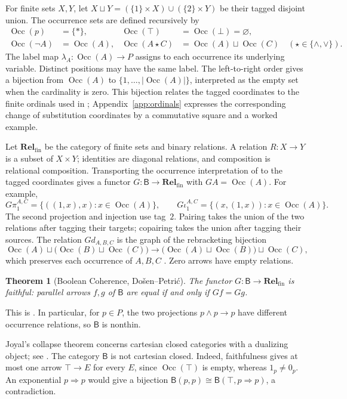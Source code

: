 \documentclass[11pt]{article}
\newtheorem{theorem}{Theorem}[section]
\newcommand{\B}{\mathsf B}
\newcommand{\Occ}{\operatorname{Occ}}
\newcommand{\Rel}{\mathbf{Rel}_{\mathrm{fin}}}
\begin{document}
For finite sets $X,Y$, let
$X\sqcup Y=(\{1\}\times X)\cup(\{2\}\times Y)$ be their tagged
disjoint union. The occurrence sets are defined recursively by
\[
 \begin{aligned}
 \Occ(p)&=\{*\},&
 \Occ(\top)&=\Occ(\bot)=\varnothing,\\
 \Occ(\neg A)&=\Occ(A),&
 \Occ(A\mathbin\star C)&=\Occ(A)\sqcup\Occ(C)
       \quad(\star\in\{\wedge,\vee\}).
 \end{aligned}
\]
The label map $\lambda_A:\Occ(A)\to P$ assigns to each occurrence
its underlying variable. Distinct positions may have the same label.
The left-to-right
order gives a bijection from $\Occ(A)$ to
$\{1,\ldots,|\Occ(A)|\}$, interpreted as the empty set when the
cardinality is zero. This bijection relates the tagged coordinates to
the finite ordinals used in \cite{DP}; Appendix~\ref{app:ordinals}
expresses the corresponding change of substitution coordinates by a
commutative square and a worked example.

Let $\Rel$ be the category of finite sets and binary relations.
A relation $R:X\to Y$ is a subset of $X\times Y$; identities are
diagonal relations, and composition is relational composition.
Transporting the occurrence interpretation of \cite{DP} to the
tagged coordinates gives a functor
$G:\B\to\Rel$ with $GA=\Occ(A)$.
For example,
\[
 G\pi_1^{A,C}=\{((1,x),x):x\in\Occ(A)\},\qquad
 G\iota_1^{A,C}=\{(x,(1,x)):x\in\Occ(A)\}.
\]
The second projection and injection use tag~$2$. Pairing takes the
union of the two relations after tagging their targets; copairing
takes the union after tagging their sources. The relation $Gd_{A,B,C}$
is the graph of the rebracketing bijection
\[
 \Occ(A)\sqcup\bigl(\Occ(B)\sqcup\Occ(C)\bigr)
 \longrightarrow
 \bigl(\Occ(A)\sqcup\Occ(B)\bigr)\sqcup\Occ(C),
\]
which preserves each occurrence of $A,B,C$
\cite[\S2.9, p.~60]{DP}. Zero arrows have empty relations.

\begin{theorem}[Boolean Coherence, Do\v{s}en--Petri\'c]
\label{thm:coherence}
The functor $G:\B\to\Rel$ is faithful: parallel arrows $f,g$ of
$\B$ are equal if and only if $Gf=Gg$.
\end{theorem}

This is \cite[\S14.2, p.~321]{DP}. In particular, for $p\in P$, the
two projections $p\wedge p\to p$ have different occurrence
relations, so $\B$ is nonthin.

Joyal's collapse theorem concerns cartesian closed categories with a
dualizing object; see \cite[\S14.3, pp.~324--326]{DP}. The category
$\B$ is not cartesian closed. Indeed, faithfulness gives at most one
arrow $\top\to E$ for every $E$, since $\Occ(\top)$ is empty,
whereas $1_p\ne0_p$. An exponential $p\Rightarrow p$ would give
a bijection $\B(p,p)\cong\B(\top,p\Rightarrow p)$, a contradiction.
\end{document}
